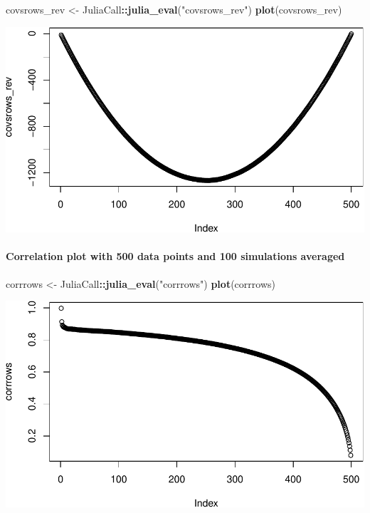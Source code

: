 \documentclass[]{article}
\newenvironment{Shaded}{\begin{snugshade}}{\end{snugshade}}
\newcommand{\KeywordTok}[1]{\textcolor[rgb]{0.13,0.29,0.53}{\textbf{#1}}}
\newcommand{\NormalTok}[1]{#1}
\newcommand{\OperatorTok}[1]{\textcolor[rgb]{0.81,0.36,0.00}{\textbf{#1}}}
\newcommand{\StringTok}[1]{\textcolor[rgb]{0.31,0.60,0.02}{#1}}
\let\oldparagraph\paragraph
\renewcommand{\paragraph}[1]{\oldparagraph{#1}\mbox{}}
\begin{document}
\begin{Shaded}
\begin{Highlighting}[]
\NormalTok{covsrows_rev <-}\StringTok{ }\NormalTok{JuliaCall}\OperatorTok{::}\KeywordTok{julia_eval}\NormalTok{(}\StringTok{"covsrows_rev"}\NormalTok{)}
\KeywordTok{plot}\NormalTok{(covsrows_rev)}
\end{Highlighting}
\end{Shaded}

\includegraphics{./figures/unnamed-chunk-16-1.pdf}

\hypertarget{correlation-plot-with-500-data-points-and-100-simulations-averaged}{%
\paragraph{Correlation plot with 500 data points and 100 simulations
averaged}\label{correlation-plot-with-500-data-points-and-100-simulations-averaged}}

\begin{Shaded}
\begin{Highlighting}[]
\NormalTok{corrrows <-}\StringTok{ }\NormalTok{JuliaCall}\OperatorTok{::}\KeywordTok{julia_eval}\NormalTok{(}\StringTok{"corrrows"}\NormalTok{)}
\KeywordTok{plot}\NormalTok{(corrrows)}
\end{Highlighting}
\end{Shaded}

\includegraphics{./figures/unnamed-chunk-17-1.pdf}
\end{document}
